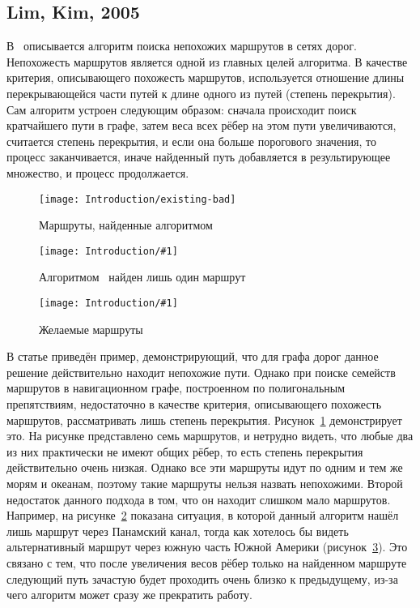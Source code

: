 \FloatBarrier

\subsection{Lim, Kim, 2005}

\label{subsec:lim-kim}

В~\cite{lim2005shortest} описывается алгоритм поиска непохожих
маршрутов в сетях дорог. Непохожесть маршрутов является одной из
главных целей алгоритма. В качестве критерия, описывающего похожесть
маршрутов, используется отношение длины перекрывающейся части путей к
длине одного из путей (степень перекрытия). Сам алгоритм устроен
следующим образом: сначала происходит поиск кратчайшего пути в графе,
затем веса всех рёбер на этом пути увеличиваются, считается степень
перекрытия, и если она больше порогового значения, то процесс
заканчивается, иначе найденный путь добавляется в результирующее
множество, и процесс продолжается.

\begin{figure}
    \texttt{[image: Introduction/existing-bad]}
    \caption{Маршруты, найденные алгоритмом~\cite{lim2005shortest}}
    \label{fig:limkim1}
\end{figure}

\newcommand{\limkimpicture}[1] {
    \begin{center}
    \texttt{[image: Introduction/\#1]}
    \end{center}
}

\begin{figure}
    \limkimpicture{limkim-only-one}
    \caption{Алгоритмом~\cite{lim2005shortest} найден лишь один маршрут}
    \label{fig:limkim2}
\end{figure}

\begin{figure}
    \limkimpicture{limkim-desired}
    \caption{Желаемые маршруты}
    \label{fig:limkim3}
\end{figure}

В статье приведён пример, демонстрирующий, что для графа дорог данное
решение действительно находит непохожие пути. Однако при поиске
семейств маршрутов в навигационном графе, построенном по полигональным
препятствиям, недостаточно в качестве критерия, описывающего похожесть
маршрутов, рассматривать лишь степень перекрытия.
Рисунок~\ref{fig:limkim1} демонстрирует это. На рисунке представлено
семь маршрутов, и нетрудно видеть, что любые два из них практически не
имеют общих рёбер, то есть степень перекрытия действительно очень
низкая. Однако все эти маршруты идут по одним и тем же морям и
океанам, поэтому такие маршруты нельзя назвать непохожими. Второй
недостаток данного подхода в том, что он находит слишком мало
маршрутов. Например, на рисунке~\ref{fig:limkim2} показана ситуация, в
которой данный алгоритм нашёл лишь маршрут через Панамский канал,
тогда как хотелось бы видеть альтернативный маршрут через южную часть
Южной Америки (рисунок~\ref{fig:limkim3}). Это связано с тем, что
после увеличения весов рёбер только на найденном маршруте следующий
путь зачастую будет проходить очень близко к предыдущему, из-за чего
алгоритм может сразу же прекратить работу.

